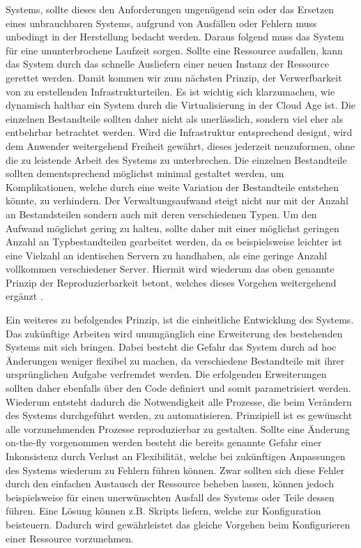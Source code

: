 \documentclass[biblatex]{lni}
\begin{document}
Systems, sollte dieses den Anforderungen ungenügend sein oder das Ersetzen eines unbrauchbaren Systems, aufgrund von Ausfällen oder Fehlern muss unbedingt in der Herstellung bedacht werden. Daraus folgend muss das System für eine ununterbrochene Laufzeit sorgen. Sollte eine Ressource ausfallen, kann das System durch das schnelle Ausliefern einer neuen Instanz der Ressource gerettet werden. Damit kommen wir zum nächsten Prinzip, der Verwerfbarkeit von zu erstellenden Infrastrukturteilen. Es ist wichtig sich klarzumachen, wie dynamisch haltbar ein System durch die Virtualisierung in der Cloud Age ist. Die einzelnen Bestandteile sollten daher nicht als unerlässlich, sondern viel eher als entbehrbar betrachtet werden. Wird die Infrastruktur entsprechend designt, wird dem Anwender weitergehend Freiheit gewährt, dieses jederzeit neuzuformen, ohne die zu leistende Arbeit des Systems zu unterbrechen. Die einzelnen Bestandteile sollten dementsprechend möglichst minimal gestaltet werden, um Komplikationen, welche durch eine weite Variation der Bestandteile entstehen könnte, zu verhindern. Der Verwaltungsaufwand steigt nicht nur mit der Anzahl an Bestandsteilen sondern auch mit deren verschiedenen Typen. Um den Aufwand möglichst gering zu halten, sollte daher mit einer möglichst geringen Anzahl an Typbestandteilen gearbeitet werden, da es beispielsweise leichter ist eine Vielzahl an identischen Servern zu handhaben, als eine geringe Anzahl vollkommen verschiedener Server. Hiermit wird wiederum das oben genannte Prinzip der Reproduzierbarkeit betont, welches dieses Vorgehen weitergehend ergänzt \cite{Morris.December2020}.

Ein weiteres zu befolgendes Prinzip, ist die einheitliche Entwicklung des Systems. Das zukünftige Arbeiten wird unumgänglich eine Erweiterung des bestehenden Systems mit sich bringen. Dabei besteht die Gefahr das System durch ad hoc Änderungen weniger flexibel zu machen, da verschiedene Bestandteile mit ihrer ursprünglichen Aufgabe verfremdet werden. Die erfolgenden Erweiterungen sollten daher ebenfalls über den Code definiert und somit parametrisiert werden. Wiederum entsteht dadurch die Notwendigkeit alle Prozesse, die beim Verändern des Systems durchgeführt werden, zu automatisieren. Prinzipiell ist es gewünscht alle vorzunehmenden Prozesse reproduzierbar zu gestalten. Sollte eine Änderung on-the-fly vorgenommen werden besteht die bereits genannte Gefahr einer Inkonsistenz durch Verlust an Flexibilität, welche bei zukünftigen Anpassungen des Systems wiederum zu Fehlern führen können. Zwar sollten sich diese Fehler durch den einfachen Austausch der Ressource beheben lassen, können jedoch beispielsweise für einen unerwünschten Ausfall des Systems oder Teile dessen führen. Eine Lösung können z.B. Skripts liefern, welche zur Konfiguration beisteuern. Dadurch wird gewährleistet das gleiche Vorgehen beim Konfigurieren einer Ressource vorzunehmen. 
\end{document}
